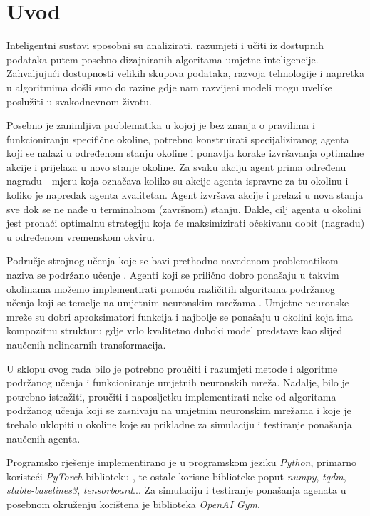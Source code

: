 \chapter{Uvod}
Inteligentni sustavi sposobni su analizirati, razumjeti i učiti iz dostupnih podataka putem posebno dizajniranih algoritama umjetne inteligencije. Zahvaljujući dostupnosti velikih skupova podataka, razvoja tehnologije i napretka u algoritmima došli smo do razine gdje nam razvijeni modeli mogu uvelike poslužiti u svakodnevnom životu.

Posebno je zanimljiva problematika u kojoj je bez znanja o pravilima i funkcioniranju specifične okoline, potrebno konstruirati specijaliziranog agenta koji se nalazi u određenom stanju okoline i ponavlja korake izvršavanja optimalne akcije i prijelaza u novo stanje okoline. Za svaku akciju agent prima određenu nagradu - mjeru koja označava koliko su akcije agenta ispravne za tu okolinu i koliko je napredak agenta kvalitetan. Agent izvršava akcije i prelazi u nova stanja sve dok se ne nađe u terminalnom (završnom) stanju. Dakle, cilj agenta u okolini jest pronaći optimalnu strategiju koja će maksimizirati očekivanu dobit (nagradu) u određenom vremenskom okviru.

Područje strojnog učenja koje se bavi prethodno navedenom problematikom naziva se podržano učenje . Agenti koji se prilično dobro ponašaju u takvim okolinama možemo implementirati pomoću različitih algoritama podržanog učenja koji se temelje na umjetnim neuronskim mrežama . Umjetne neuronske mreže su dobri aproksimatori funkcija i najbolje se ponašaju u okolini koja ima kompozitnu strukturu gdje vrlo kvalitetno duboki model predstave kao slijed naučenih nelinearnih transformacija.

U sklopu ovog rada bilo je potrebno proučiti i razumjeti metode i algoritme podržanog učenja i funkcioniranje umjetnih neuronskih mreža. Nadalje, bilo je potrebno istražiti, proučiti i naposljetku implementirati neke od algoritama podržanog učenja koji se zasnivaju na umjetnim neuronskim mrežama i koje je trebalo uklopiti u okoline koje su prikladne za simulaciju i testiranje ponašanja naučenih agenta.

Programsko rješenje implementirano je u programskom jeziku \textit{Python}, primarno koristeći \textit{PyTorch} biblioteku , te ostale korisne biblioteke poput \textit{numpy}, \textit{tqdm}, \textit{stable-baselines3}, \textit{tensorboard}... Za simulaciju i testiranje ponašanja agenata u posebnom okruženju korištena je biblioteka \textit{OpenAI Gym}. 
